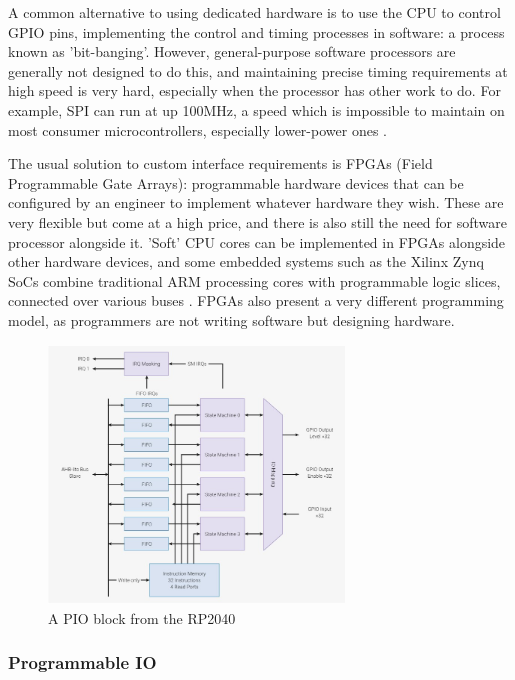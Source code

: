 \documentclass[a4paper,fleqn,12pt]{article}
\begin{document}
A common alternative to using dedicated hardware is to use the CPU to control GPIO pins, implementing the control and timing processes in software: a process known as 'bit-banging'. However, general-purpose software processors are generally not designed to do this, and maintaining precise timing requirements at high speed is very hard, especially when the processor has other work to do. For example, SPI can run at up 100MHz, a speed which is impossible to maintain on most consumer microcontrollers, especially lower-power ones \citep{picosdk}.

The usual solution to custom interface requirements is FPGAs (Field Programmable Gate Arrays): programmable hardware devices that can be configured by an engineer to implement whatever hardware they wish. These are very flexible but come at a high price, and there is also still the need for software processor alongside it. 'Soft' CPU cores can be implemented in FPGAs alongside other hardware devices, and some embedded systems such as the Xilinx Zynq SoCs combine traditional ARM processing cores with programmable logic slices, connected over various buses \citep{zynq}. FPGAs also present a very different programming model, as programmers are not writing software but designing hardware.


\begin{figure}[b!]
    \centering
    \includegraphics[width=0.7\textwidth]{../img/pio-block.jpg}
    \caption{A PIO block from the RP2040 \citep{rp2040}}
    \label{fig:pio-block}
\end{figure}

\subsubsection{Programmable IO}
\end{document}
